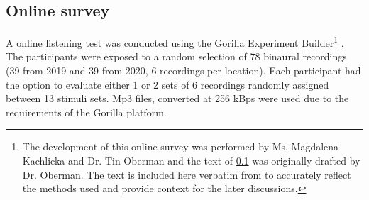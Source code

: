  \subsection{Online survey}
\label{sec:GorillaTin}
 
   A online listening test was conducted using the Gorilla Experiment Builder\footnote{The development of this online survey was performed by Ms. Magdalena Kachlicka and Dr. Tin Oberman and the text of \cref{sec:GorillaTin} was originally drafted by Dr. Oberman. The text is included here verbatim from \citet{Mitchell2021Investigating} to accurately reflect the methods used and provide context for the later discussions.} \citep{AnwylIrvine2019Gorilla}. The participants were exposed to a random selection of 78 binaural recordings (39 from 2019 and 39 from 2020, 6 recordings per location). Each participant had the option to evaluate either 1 or 2 sets of 6 recordings randomly assigned between 13 stimuli sets. Mp3 files, converted at 256 kBps were used due to the requirements of the Gorilla platform.


